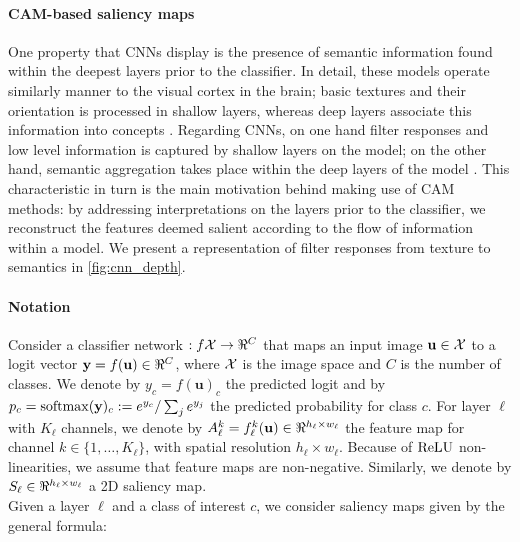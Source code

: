 \paragraph{CAM-based saliency maps}
One property that CNNs display is the presence of semantic information found within the 
deepest layers prior to the classifier. In detail, these models 
operate similarly manner to the visual cortex in the brain; basic textures and their orientation 
is processed in shallow layers, whereas deep layers associate this information into concepts 
\autocite{hubel1959receptive}. Regarding CNNs, on one hand filter responses and low level 
information is captured by shallow layers on the model; on the other hand, semantic aggregation 
takes place within the deep layers of the model \autocite{lee2009convolutional}. This characteristic 
in turn is the main motivation behind making use of CAM methods: by addressing interpretations on 
the layers prior to the classifier, we reconstruct the features deemed salient according to the 
flow of information within a model. We present a representation of filter responses from texture 
to semantics in \autoref{fig:cnn_depth}.

\paragraph{Notation}
\label{sec:oc_notation}
Consider a classifier network $:f \cX \to \real^C$ that maps an input image $\mathbf{u} \in \mathcal{X}$ to a 
logit vector $\vy = f(\mathbf{u}) \in \real^C$, where $\mathcal{X}$ is the image space and $C$ is the number 
of classes. We denote by $y_c = f(\mathbf{u})_c$ the predicted logit and by $p_c = \operatorname{softmax}(\mathbf{y})_c 
\mathrel{:=} e^{y_c} / \sum_j e^{y_j}$ the predicted probability for class $c$. For layer $\ell$ 
with $K_\ell$ channels, we denote by $A^k_\ell = f^k_\ell(\mathbf{u}) \in \real^{h_\ell \times w_\ell}$ 
the feature map for channel $k \in \{1,\dots,K_\ell\}$, with spatial resolution $h_\ell \times 
w_\ell$. Because of ${\operatorname{ReLU}}$ non-linearities, we assume that feature maps are non-negative. 
Similarly, we denote by $S_\ell \in \real^{h_\ell \times w_\ell}$ a 2D saliency map.\\

\label{sec:oc_back}
\noindent Given a layer $\ell$ and a class of interest $c$, we consider saliency maps given by the 
general formula: \\

